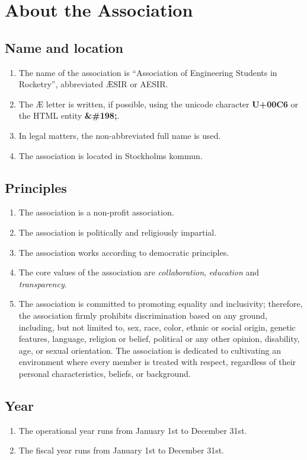 
\section*{About the Association}

\subsection{Name and location}
\begin{enumerate}
  \item The name of the association is “Association of Engineering Students in Rocketry”, abbreviated ÆSIR or AESIR.
  \item The Æ letter is written, if possible, using the unicode character \textbf{U+00C6} or the HTML entity \textbf{\&\#198;}.
  \item In legal matters, the non-abbreviated full name is used.
  \item The association is located in Stockholms kommun.
\end{enumerate}

\subsection{Principles} \label{sec:principles}
\begin{enumerate}
  \item The association is a non-profit association.
  \item The association is politically and religiously impartial.
  \item The association works according to democratic principles.
  \item The core values of the association are \emph{collaboration}, \emph{education} and \emph{transparency}.
  \item The association is committed to promoting equality and inclusivity; therefore, the association firmly prohibits discrimination based on any ground, including, but not limited to, sex, race, color, ethnic or social origin, genetic features, language, religion or belief, political or any other opinion, disability, age, or sexual orientation. The association is dedicated to cultivating an environment where every member is treated with respect, regardless of their personal characteristics, beliefs, or background.
\end{enumerate}


\subsection{Year}
\begin{enumerate}
  \item The operational year runs from January 1st to December 31st.
  \item The fiscal year runs from January 1st to December 31st.
\end{enumerate}


